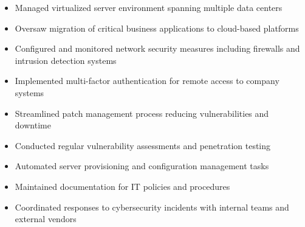 \begin{itemize}
    \item Managed virtualized server environment spanning multiple data centers
    \item Oversaw migration of critical business applications to cloud-based platforms
    \item Configured and monitored network security measures including firewalls and intrusion detection systems
    \item Implemented multi-factor authentication for remote access to company systems
    \item Streamlined patch management process reducing vulnerabilities and downtime
    \item Conducted regular vulnerability assessments and penetration testing
    \item Automated server provisioning and configuration management tasks
    \item Maintained documentation for IT policies and procedures
    \item Coordinated responses to cybersecurity incidents with internal teams and external vendors
\end{itemize}

\vspace{8pt}